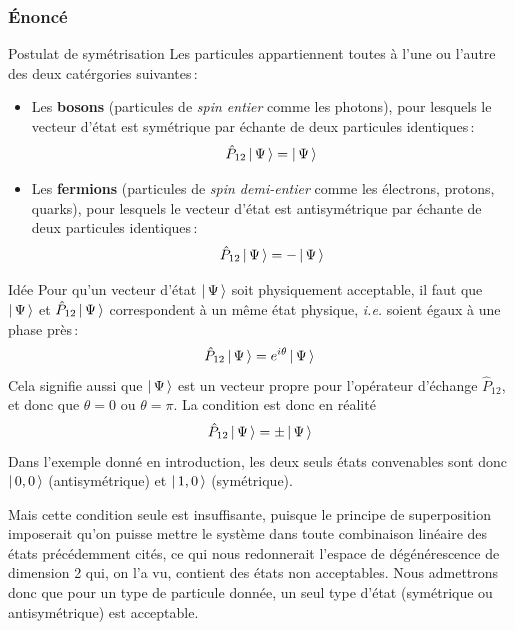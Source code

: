        \subsubsection{Énoncé}

        \begin{omed}{Postulat de symétrisation}
            Les particules appartiennent toutes à l’une ou l’autre des deux catérgories suivantes :
            \begin{itemize}
                \item Les \textbf{bosons} (particules de \textit{spin entier} comme les photons), pour lesquels le vecteur d’état est symétrique par échante de deux particules identiques :
                \[ \hat{P}_{12} \left| \, \Psi \, \right> = \left| \, \Psi \, \right> \]   
                \item Les \textbf{fermions} (particules de \textit{spin demi-entier} comme les électrons, protons, quarks), pour lesquels le vecteur d’état est antisymétrique par échante de deux particules identiques :
                \[ \hat{P}_{12} \left| \, \Psi \, \right> = - \left| \, \Psi \, \right> \]   
            \end{itemize}
        \end{omed}

        \begin{demo}{Idée}
            Pour qu’un vecteur d’état $\left| \, \Psi \, \right>$ soit physiquement acceptable, il faut que $\left| \, \Psi \, \right>$ et $\hat{P}_{12}\left| \, \Psi \, \right>$ correspondent à un même état physique, \textit{i.e.} soient égaux à une phase près :
            \[ \hat{P}_{12} \left| \, \Psi \, \right> = e^{i\theta} \left| \, \Psi \, \right> \]  
            Cela signifie aussi que $\left| \, \Psi \, \right>$ est un vecteur propre pour l’opérateur d’échange $\hat{P}_{12}$, et donc que $\theta = 0$ ou $\theta = \pi$. La condition est donc en réalité 
            \[ \hat{P}_{12} \left| \, \Psi \, \right> = \pm \left| \, \Psi \, \right> \]  
            Dans l’exemple donné en introduction, les deux seuls états convenables sont donc $\left| \, 0,0 \, \right>$ (antisymétrique) et $\left| \, 1,0 \, \right>$ (symétrique).

            Mais cette condition seule est insuffisante, puisque le principe de superposition imposerait qu’on puisse mettre le système dans toute combinaison linéaire des états précédemment cités, ce qui nous redonnerait l’espace de dégénérescence de dimension 2 qui, on l’a vu, contient des états non acceptables. Nous admettrons donc que pour un type de particule donnée, un seul type d’état (symétrique ou antisymétrique) est acceptable.
        \end{demo}

